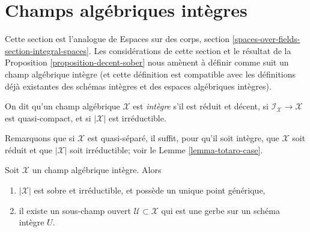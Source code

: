 %
\section{Champs alg\'ebriques int\`egres}
\label{section-integral-stacks}

\noindent
Cette section est l'analogue de Espaces sur des corps, section
\ref{spaces-over-fields-section-integral-spaces}.
Les consid\'erations de cette section et le r\'esultat de la
Proposition \ref{proposition-decent-sober} nous am\`enent \`a d\'efinir
comme suit un champ alg\'ebrique int\`egre (et cette d\'efinition est compatible
avec les d\'efinitions d\'ej\`a existantes des sch\'emas int\`egres et
des espaces alg\'ebriques int\`egres).

\begin{definition}
\label{definition-integral-algebraic-stack}
On dit qu'un champ alg\'ebrique $\mathcal{X}$ est
{\it int\`egre} s'il est r\'eduit et d\'ecent, si
$\mathcal{I}_\mathcal{X} \to \mathcal{X}$ est quasi-compact,
et si $|\mathcal{X}|$ est irr\'eductible.
\end{definition}

\noindent
Remarquons que si $\mathcal{X}$ est quasi-s\'epar\'e, il suffit,
pour qu'il soit int\`egre, que $\mathcal{X}$ soit r\'eduit et que
$|\mathcal{X}|$ soit irr\'eductible; voir le Lemme \ref{lemma-totaro-case}.

\begin{lemma}
\label{lemma-structure-integral-stack}
Soit $\mathcal{X}$ un champ alg\'ebrique int\`egre. Alors
\begin{enumerate}
\item $|\mathcal{X}|$ est sobre et irr\'eductible, et poss\`ede un unique point g\'en\'erique,
\item il existe un sous-champ ouvert $\mathcal{U} \subset \mathcal{X}$
qui est une gerbe sur un sch\'ema int\`egre $U$.
\end{enumerate}
\end{lemma}

